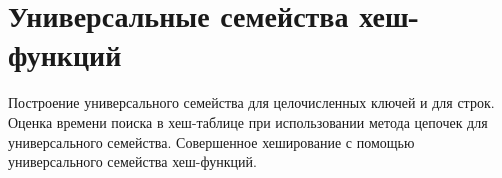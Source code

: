 \section{Универсальные семейства хеш-функций}
Построение универсального семейства для
целочисленных ключей и для строк.
Оценка времени поиска в хеш-таблице
при использовании метода цепочек для универсального семейства.
Совершенное хеширование с помощью
универсального семейства хеш-функций.
